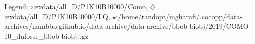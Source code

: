 Legend: {\color{CornflowerBlue}$\circ$}:exdata/all\_D/P1K10B10000/Como, {\color{Orange}$\diamondsuit$}:exdata/all\_D/P1K10B10000/LQ, {\color{Green}$\star$}:/home/randopt/mgharafi/.cocopp/data-archives/numbbo.github.io/data-archive/data-archive/bbob-biobj/2019/COMO-10\_dufosse\_bbob-biobj.tgz